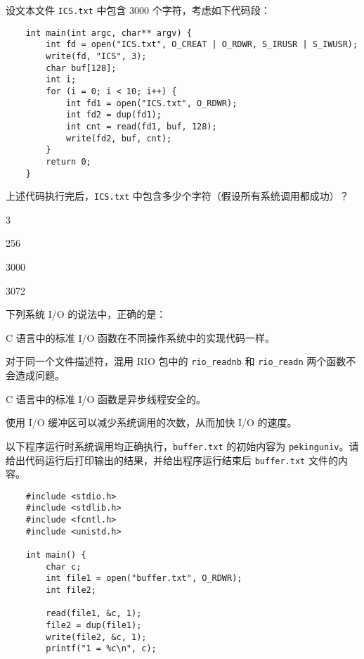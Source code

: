 \begin{problems}
         设文本文件 \verb|ICS.txt| 中包含 3000 个字符，考虑如下代码段：
        \begin{verbatim}
    int main(int argc, char** argv) {
        int fd = open("ICS.txt", O_CREAT | O_RDWR, S_IRUSR | S_IWUSR);
        write(fd, "ICS", 3);
        char buf[128];
        int i;
        for (i = 0; i < 10; i++) {
            int fd1 = open("ICS.txt", O_RDWR);
            int fd2 = dup(fd1);
            int cnt = read(fd1, buf, 128);
            write(fd2, buf, cnt);
        }
        return 0; 
    }
        \end{verbatim}
        上述代码执行完后，\verb|ICS.txt| 中包含多少个字符（假设所有系统调用都成功）？
        \begin{choices}
            \item 3
            \item 256
            \item 3000
            \item 3072
        \end{choices}
         下列系统 I/O 的说法中，正确的是：
        \begin{choices}
            \item C 语言中的标准 I/O 函数在不同操作系统中的实现代码一样。
            \item 对于同一个文件描述符，混用 RIO 包中的 \verb|rio_readnb| 和 \verb|rio_readn| 两个函数不会造成问题。
            \item C 语言中的标准 I/O 函数是异步线程安全的。
            \item 使用 I/O 缓冲区可以减少系统调用的次数，从而加快 I/O 的速度。
        \end{choices}
         以下程序运行时系统调用均正确执行，\verb|buffer.txt| 的初始内容为 \verb|pekinguniv|。请给出代码运行后打印输出的结果，并给出程序运行结束后 \verb|buffer.txt| 文件的内容。
        \begin{verbatim}
    #include <stdio.h>
    #include <stdlib.h>
    #include <fcntl.h>
    #include <unistd.h>

    int main() {
        char c;
        int file1 = open("buffer.txt", O_RDWR);
        int file2;

        read(file1, &c, 1);
        file2 = dup(file1);
        write(file2, &c, 1);
        printf("1 = %c\n", c);


\end{verbatim}
\end{problems}
